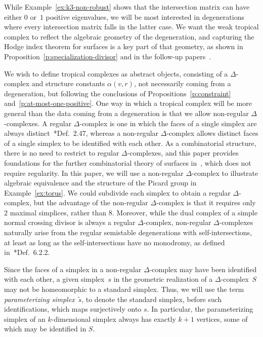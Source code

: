 \documentclass[11pt,reqno]{amsart}
\theoremstyle{definition}
\newcommand{\defi}[1]{\emph{#1}}
\begin{document}
While Example~\ref{ex:k3-non-robust} shows that the intersection matrix
can have either $0$ or~$1$ positive eigenvalues, we will be most interested in
degenerations where every intersection matrix falls in the latter case. We
want the weak tropical complex to reflect the algebraic geometry of the
degeneration, and capturing the Hodge index theorem for surfaces is a key part
of that geometry, as shown in Proposition~\ref{p:specialization-divisor} and in
the follow-up papers~\cites{cartwright-surfaces,cartwright-specialization}.

We wish to define tropical complexes as abstract objects, consisting of a
$\Delta$-complex and structure constants $\alpha(v,r)$, not necessarily coming
from a degeneration, but following the conclusions of
Propositions~\ref{p:constraint} and~\ref{p:at-most-one-positive}. One way in
which a tropical complex will be more general than the data coming from a
degeneration is that we allow non-regular $\Delta$-complexes. A regular
$\Delta$-complex is one in which the faces of a single simplex are always
distinct~\cite{kozlov}*{Def.~2.47}, whereas a non-regular $\Delta$-complex
allows distinct faces of a single simplex to be identified with each other. As a
combinatorial structure, there is no need to restrict to regular
$\Delta$-complexes, and this paper provides foundations for the further
combinatorial theory of surfaces in~\cite{cartwright-surfaces}, which does not
require regularity. In this paper, we will use a non-regular $\Delta$-complex to
illustrate algebraic equivalence and the structure of the Picard group in
Example~\ref{ex:torus}. We could subdivide each simplex to obtain a regular
$\Delta$-complex, but the advantage of the non-regular $\Delta$-complex is that
it requires only $2$ maximal simplices, rather than $8$. Moreover, while the
dual complex of a simple normal crossing divisor is always a regular
$\Delta$-complex, non-regular $\Delta$-complexes naturally arise from the
regular semistable degenerations with self-intersections, at least as long as
the self-intersections have no monodromy, as defined
in~\cite{abramovich-caporaso-payne}*{Def.~6.2.2}.

Since the faces of a simplex in a non-regular $\Delta$-complex may have been
identified with each other, a given simplex~$s$ in the geometric realization of
a $\Delta$-complex~$S$ may not be homeomorphic to a standard simplex. Thus, we
will use the term
\defi{parameterizing simplex}~$\tilde s$, to denote the standard simplex, before
such identifications, which maps surjectively onto $s$. In particular, the
parameterizing simplex of an $k$-dimensional simplex always has exactly $k+1$
vertices, some of which may be identified in $S$.
\end{document}
